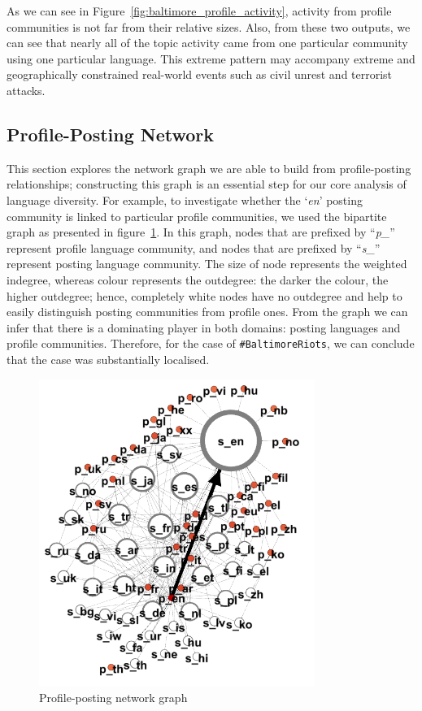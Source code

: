 \documentclass{llncs}
\begin{document}
As we can see in Figure~\ref{fig:baltimore_profile_activity}, activity
from profile communities is not far from their relative sizes.  Also,
from these two outputs, we can see that nearly all of the topic
activity came from one particular community using one particular
language. This extreme pattern may accompany extreme and
geographically constrained real-world events such as civil unrest and
terrorist attacks.

\subsection{Profile-Posting Network}

This section explores the network graph we are able to build from
profile-posting relationships; constructing this graph is an essential
step for our core analysis of language diversity. For example, to
investigate whether the `{\emph{en}}' posting community is linked to
particular profile communities, we used the bipartite graph as
presented in figure~\ref{fig:baltimore_p_s_lang_sl}.  In this graph,
nodes that are prefixed by ``{\emph{p\_}}'' represent profile language
community, and nodes that are prefixed by ``{\emph{s\_}}'' represent
posting language community. The size of node represents the weighted
indegree, whereas colour represents the outdegree: the darker the
colour, the higher outdegree; hence, completely white nodes have no
outdegree and help to easily distinguish posting communities from
profile ones. From the graph we can infer that there is a dominating
player in both domains: posting languages and profile communities.
Therefore, for the case of {\texttt{\#BaltimoreRiots}}, we can
conclude that the case was substantially localised.

\begin{figure}[!htb]
\centering
\includegraphics[width=0.8\textwidth]{images/baltimore_p_s_lang_sl.png}
\caption{Profile-posting network graph}
\label{fig:baltimore_p_s_lang_sl}
\end{figure}
\end{document}
